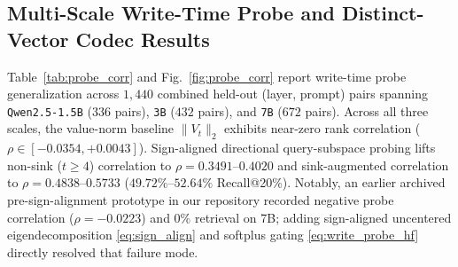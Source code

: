 \documentclass[conference]{IEEEtran}
\begin{document}
\subsection{Multi-Scale Write-Time Probe and Distinct-Vector Codec Results}
Table~\ref{tab:probe_corr} and Fig.~\ref{fig:probe_corr} report write-time probe generalization across $1{,}440$ combined held-out (layer, prompt) pairs spanning \texttt{Qwen2.5-1.5B} ($336$ pairs), \texttt{3B} ($432$ pairs), and \texttt{7B} ($672$ pairs). Across all three scales, the value-norm baseline $\|V_t\|_2$ exhibits near-zero rank correlation ($\rho \in [-0.0354, +0.0043]$). Sign-aligned directional query-subspace probing lifts non-sink ($t \ge 4$) correlation to $\rho = 0.3491$--$0.4020$ and sink-augmented correlation to $\rho = 0.4838$--$0.5733$ ($49.72\%$--$52.64\%$ Recall@20\%). Notably, an earlier archived pre-sign-alignment prototype in our repository recorded negative probe correlation ($\rho = -0.0223$) and $0\%$ retrieval on 7B; adding sign-aligned uncentered eigendecomposition \eqref{eq:sign_align} and softplus gating \eqref{eq:write_probe_hf} directly resolved that failure mode.

\begin{table}[t]
\caption{One-Step Ridge-Preconditioned Sparse Coding vs. OMP and 30-Step FISTA on 1,024 Strictly Distinct, Non-Tiled Real Paul Graham Prose KV Vectors (\texttt{Qwen2.5-1.5B} Layer 10, $d=128$, CUDA FP16)}
\begin{center}
\label{tab:codec_results}
\end{center}
\end{table}
\end{document}
